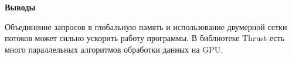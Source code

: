 \textbf{\large Выводы}

Объединение запросов в глобальную память и использование двумерной сетки потоков может сильно ускорить работу программы. В библиотеке Thrust есть много параллельных алгоритмов обработки данных на GPU.
